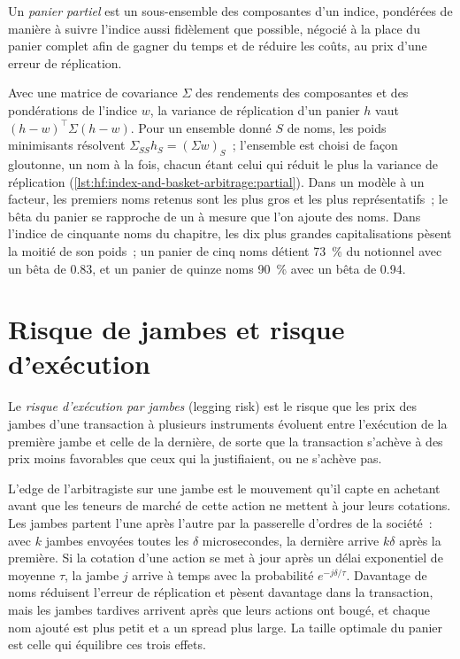 \begin{definition}\label{def:hf:index-and-basket-arbitrage:partial}
Un \emph{panier partiel} est un sous-ensemble des composantes d'un indice, pondérées de manière à suivre l'indice aussi fidèlement que possible,
négocié à la place du panier complet afin de gagner du temps et de réduire les coûts, au prix d'une erreur de réplication.
\end{definition}

Avec une matrice de covariance $\Sigma$ des rendements des composantes et des pondérations de l'indice $w$, la variance de réplication d'un panier $h$ vaut
$(h-w)^\top\Sigma(h-w)$. Pour un ensemble donné $S$ de noms, les poids minimisants résolvent $\Sigma_{SS}h_S=(\Sigma w)_S$~; l'ensemble est choisi de façon gloutonne, un nom
à la fois, chacun étant celui qui réduit le plus la variance de réplication
(\cref{lst:hf:index-and-basket-arbitrage:partial}). Dans un modèle à un facteur, les premiers noms retenus sont les plus gros et les plus représentatifs~; le bêta du panier
se rapproche de un à mesure que l'on ajoute des noms. Dans l'indice de cinquante noms du chapitre, les dix plus grandes capitalisations pèsent la moitié de son poids~; un panier de cinq noms détient
73~\% du notionnel avec un bêta de 0.83, et un panier de quinze noms 90~\% avec un bêta de 0.94.

\section{Risque de jambes et risque d'exécution}

\begin{definition}\label{def:hf:index-and-basket-arbitrage:legging}
Le \emph{risque d'exécution par jambes} (legging risk) est le risque que les prix des jambes d'une transaction à plusieurs instruments évoluent entre l'exécution de la
première jambe et celle de la dernière, de sorte que la transaction s'achève à des prix moins favorables que ceux qui la justifiaient, ou ne s'achève pas.
\end{definition}

L'edge de l'arbitragiste sur une jambe est le mouvement qu'il capte en achetant avant que les teneurs de marché de cette action ne mettent à jour leurs cotations. Les jambes partent
l'une après l'autre par la passerelle d'ordres de la société~: avec $k$ jambes envoyées toutes les $\delta$ microsecondes, la dernière arrive $k\delta$ après la première. Si la cotation d'une action
se met à jour après un délai exponentiel de moyenne $\tau$, la jambe $j$ arrive à temps avec la probabilité $e^{-j\delta/\tau}$. Davantage de noms réduisent
l'erreur de réplication et pèsent davantage dans la transaction, mais les jambes tardives arrivent après que leurs actions ont bougé, et chaque nom ajouté est plus petit et a un
spread plus large. La taille optimale du panier est celle qui équilibre ces trois effets.

